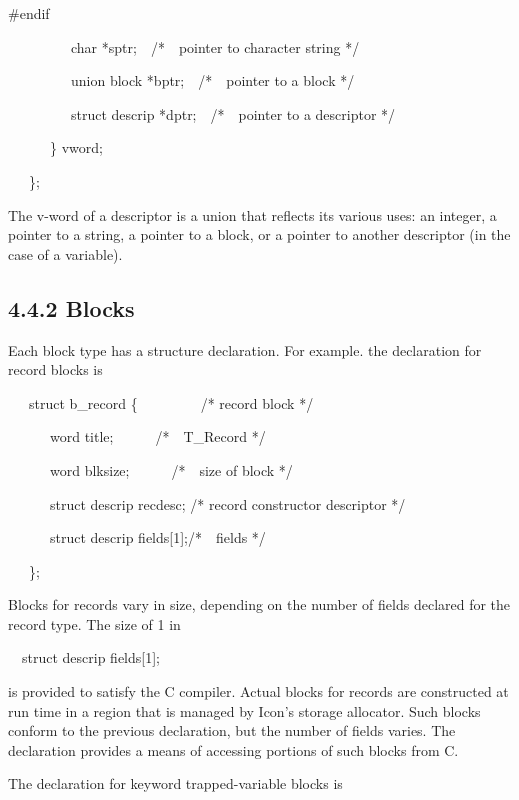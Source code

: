 {\ttfamily\color[rgb]{0.0,0.0,0.8}
\#endif}

{\ttfamily\mdseries
\ \ \ \ \ \ \ \ \ char *sptr;\ \ /*\ \ pointer to character string */}

{\ttfamily\mdseries
\ \ \ \ \ \ \ \ \ union block *bptr;\ \ /*\ \ pointer to a block */}

{\ttfamily\mdseries
\ \ \ \ \ \ \ \ \ struct descrip *dptr;\ \ /*\ \ pointer to a descriptor */}

{\ttfamily\mdseries
\ \ \ \ \ \ \} vword;}

{\ttfamily\mdseries
\ \ \ \};}


The v-word of a descriptor is a union that reflects its various uses:
an integer, a pointer to a string, a pointer to a block, or a pointer
to another descriptor (in the case of a variable).

\subsection[4.4.2 Blocks]{4.4.2 Blocks}

Each block type has a structure declaration. For example. the
declaration for record blocks is

{\ttfamily\mdseries
\ \ \ struct b\_record \{\ \  \ \ \ \ \ \ \ /* record block */}

{\ttfamily\mdseries
\ \ \ \ \ \ word title;\ \ \ \ \ \ /*\ \ T\_Record */}

{\ttfamily\mdseries
\ \ \ \ \ \ word blksize;\ \ \ \ \ \ /*\ \ size of block */}

{\ttfamily\mdseries
\ \ \ \ \ \ struct descrip recdesc; /* record constructor descriptor */}

{\ttfamily\mdseries
\ \ \ \ \ \ struct descrip fields[1];/*\ \ fields */}

{\ttfamily\mdseries
\ \ \ \};}


Blocks for records vary in size, depending on the number of fields
declared for the record type. The size of 1 in

{\ttfamily\mdseries
\ \ struct descrip fields[1];}

\noindent is provided to satisfy the C compiler. Actual blocks for
records are constructed at run time in a region that is managed by
Icon's storage allocator. Such blocks conform to the previous
declaration, but the number of fields varies. The declaration provides
a means of accessing portions of such blocks from C.

The declaration for keyword trapped-variable blocks is

